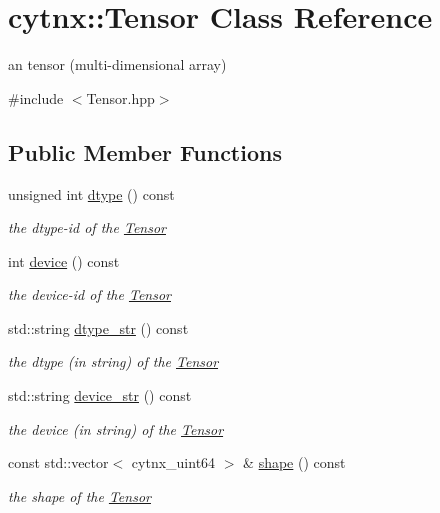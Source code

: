 \hypertarget{classcytnx_1_1Tensor}{}\section{cytnx\+:\+:Tensor Class Reference}
\label{classcytnx_1_1Tensor}


an tensor (multi-\/dimensional array)  




{\ttfamily \#include $<$Tensor.\+hpp$>$}

\subsection*{Public Member Functions}
\begin{DoxyCompactItemize}
\item 
unsigned int \hyperlink{classcytnx_1_1Tensor_a4472af6f8e825a13440e832bf82fb627}{dtype} () const
\begin{DoxyCompactList}\small\item\em the dtype-\/id of the \hyperlink{classcytnx_1_1Tensor}{Tensor} \end{DoxyCompactList}\item 
int \hyperlink{classcytnx_1_1Tensor_ac6d3310eb4defbdacf662dcd81d8fe09}{device} () const
\begin{DoxyCompactList}\small\item\em the device-\/id of the \hyperlink{classcytnx_1_1Tensor}{Tensor} \end{DoxyCompactList}\item 
std\+::string \hyperlink{classcytnx_1_1Tensor_a9e09106c7529e8be90caa52e1541e498}{dtype\+\_\+str} () const
\begin{DoxyCompactList}\small\item\em the dtype (in string) of the \hyperlink{classcytnx_1_1Tensor}{Tensor} \end{DoxyCompactList}\item 
std\+::string \hyperlink{classcytnx_1_1Tensor_a335f7625fa01784f49b2223238d0c14e}{device\+\_\+str} () const
\begin{DoxyCompactList}\small\item\em the device (in string) of the \hyperlink{classcytnx_1_1Tensor}{Tensor} \end{DoxyCompactList}\item 
const std\+::vector$<$ cytnx\+\_\+uint64 $>$ \& \hyperlink{classcytnx_1_1Tensor_a6d0ab6d09633ad4d6099aa822ec5335a}{shape} () const
\begin{DoxyCompactList}\small\item\em the shape of the \hyperlink{classcytnx_1_1Tensor}{Tensor} \end{DoxyCompactList}\item 

\end{DoxyCompactItemize}

